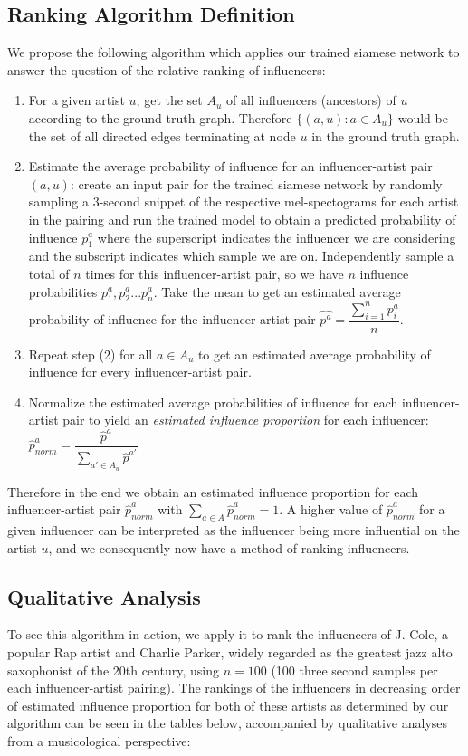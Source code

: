 \subsection{Ranking Algorithm Definition}
We propose the following algorithm which applies our trained siamese network to answer the question of the relative ranking of influencers:

\begin{enumerate}
    \item For a given artist $u$, get the set $A_u$ of all influencers (ancestors) of $u$ according to the ground truth graph. Therefore $\{(a, u) : a \in A_u\}$ would be the set of all directed edges terminating at node $u$ in the ground truth graph. 
    \item Estimate the average probability of influence for an influencer-artist pair $(a, u)$: create an input pair for the trained siamese network by randomly sampling a 3-second snippet of the respective mel-spectograms for each artist in the pairing and run the trained model to obtain a predicted probability of influence $p_1^a$ where the superscript indicates the influencer we are considering and the subscript indicates which sample we are on. 
    Independently sample a total of $n$ times for this influencer-artist pair, so we have $n$ influence probabilities $p_1^a, p_2^a ... p_n^a$. Take the mean to get an estimated average probability of influence for the influencer-artist pair $\hat{p^a} = \dfrac{\sum_{i=1}^n p_i^a}{n}$.
    \item Repeat step (2) for all $a \in A_u$ to get an estimated average probability of influence for every influencer-artist pair.
    \item Normalize the estimated average probabilities of influence for each influencer-artist pair to yield an \textit{estimated influence proportion} for each influencer: $\hat{p}_{norm}^a = \dfrac{\hat{p}^a}{\sum_{a' \in A_u}{\hat{p}^{a'}}}$
\end{enumerate}

Therefore in the end we obtain an estimated influence proportion for each influencer-artist pair $\hat{p}_{norm}^a$ with $\sum_{a \in A} \hat{p}_{norm}^a = 1$. A higher value of $\hat{p}_{norm}^a$ for a given influencer can be interpreted as the influencer being more influential on the artist $u$, and we consequently now have a method of ranking influencers.


\subsection{Qualitative Analysis}
To see this algorithm in action, we apply it to rank the influencers of J. Cole, a popular Rap artist and Charlie Parker, widely regarded as the greatest jazz alto saxophonist of the 20th century, using $n=100$ (100 three second samples per each influencer-artist pairing). The rankings of the influencers in decreasing order of estimated influence proportion for both of these artists as determined by our algorithm can be seen in the tables below, accompanied by qualitative analyses from a musicological perspective:

